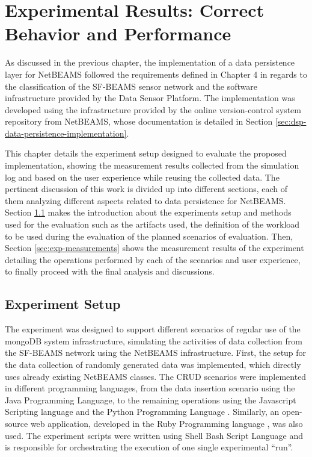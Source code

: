 

\chapter{Experimental Results: Correct Behavior and Performance}

As discussed in the previous chapter, the implementation of a data persistence
layer for NetBEAMS followed the requirements defined in Chapter 4 in regards
to the classification of the SF-BEAMS sensor network and the software
infrastructure provided by the Data Sensor Platform. The implementation was
developed using the infrastructure provided by the online version-control
system repository from NetBEAMS, whose documentation is detailed in Section
\ref{sec:dsp-data-persistence-implementation}.

This chapter details the experiment setup designed to evaluate the
proposed implementation, showing the measurement results collected from the
simulation log and based on the user experience while reusing the collected
data. The pertinent discussion of this work is divided up into different
sections, each of them analyzing different aspects related to data persistence
for NetBEAMS. Section \ref{sec:exp-setup} makes the introduction about the
experiments setup and methods used for the evaluation such as the artifacts
used, the definition of the workload to be used during the evaluation of the
planned scenarios of evaluation. Then, Section \ref{sec:exp-measurements} shows
the measurement results of the experiment detailing the operations performed by
each of the scenarios and user experience, to finally proceed with the final
analysis and discussions.

\section{Experiment Setup}
\label{sec:exp-setup}

The experiment was designed to support different scenarios of regular use of
the mongoDB system infrastructure, simulating the activities of data collection
from the SF-BEAMS network using the NetBEAMS infrastructure. First, the setup
for the data collection of randomly generated data was implemented, which
directly uses already existing NetBEAMS classes. The CRUD scenarios were
implemented in different programming languages, from the data insertion
scenario using the Java Programming Language, to the remaining operations using
the Javascript Scripting language \cite{javascript} and the Python Programming
Language \cite{python}. Similarly, an open-source web application, developed
in the Ruby Programming language \cite{ruby}, was also used. The experiment
scripts were written using Shell Bash Script Language \cite{bashshell} and is
responsible for orchestrating the execution of one single experimental ``run''.

